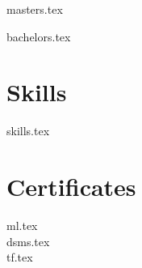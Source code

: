 \documentclass[]{deedy-resume-openfont}
\begin{document}
{masters.tex}

\sectionsep

{bachelors.tex}

\sectionsep

\section{Skills}
{skills.tex}

\sectionsep

\section{Certificates}
{ml.tex}
\vspace{\topsep}\\
{dsms.tex}
\vspace{\topsep}\\
{tf.tex}




\end{document}
